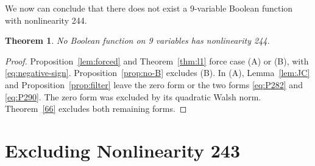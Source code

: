 \documentclass[11pt]{article}
\newtheorem{theorem}{Theorem}
\newtheorem{open problem}{Open problem}
\begin{document}
We now can conclude that there does not exist a 9-variable Boolean function with nonlinearity 244.

\begin{theorem}\label{thm:no24}
No Boolean function on 9 variables has nonlinearity 244.
\end{theorem}
\begin{proof}
Proposition~\ref{lem:forced} and Theorem~\ref{thm:l1} force case (A) or (B), with \eqref{eq:negative-sign}. Proposition~\ref{prop:no-B} excludes (B). In (A), Lemma~\ref{lem:JC} and Proposition~\ref{prop:filter} leave the zero form or the two forms \eqref{eq:P282} and \eqref{eq:P290}. The zero form was excluded by its quadratic Walsh norm. Theorem~\ref{66} excludes both remaining forms.
\end{proof}

\section{Excluding Nonlinearity 243}\label{sec:26}
\end{document}
